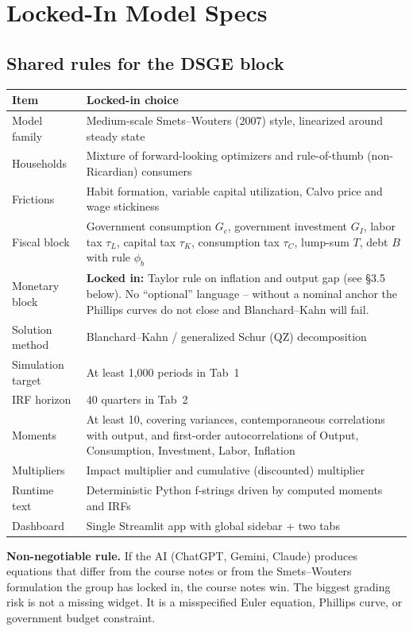 \documentclass[11pt]{article}
\begin{document}
\section{Locked-In Model Specs}

\subsection{Shared rules for the DSGE block}
\begin{tabularx}{\linewidth}{@{}p{3.3cm}X@{}}
\toprule
\textbf{Item} & \textbf{Locked-in choice} \\
\midrule
Model family & Medium-scale Smets--Wouters (2007) style, linearized around steady state \\
Households & Mixture of forward-looking optimizers and rule-of-thumb (non-Ricardian) consumers \\
Frictions & Habit formation, variable capital utilization, Calvo price and wage stickiness \\
Fiscal block & Government consumption $G_c$, government investment $G_I$, labor tax $\tau_L$, capital tax $\tau_K$, consumption tax $\tau_C$, lump-sum $T$, debt $B$ with rule $\phi_b$ \\
Monetary block & \textbf{Locked in:} Taylor rule on inflation and output gap (see \S3.5 below). No ``optional'' language -- without a nominal anchor the Phillips curves do not close and Blanchard--Kahn will fail. \\
Solution method & Blanchard--Kahn / generalized Schur (QZ) decomposition \\
Simulation target & At least 1{,}000 periods in Tab~1 \\
IRF horizon & 40 quarters in Tab~2 \\
Moments & At least 10, covering variances, contemporaneous correlations with output, and first-order autocorrelations of Output, Consumption, Investment, Labor, Inflation \\
Multipliers & Impact multiplier and cumulative (discounted) multiplier \\
Runtime text & Deterministic Python f-strings driven by computed moments and IRFs \\
Dashboard & Single Streamlit app with global sidebar + two tabs \\
\bottomrule
\end{tabularx}

\begin{warningbox}
\textbf{Non-negotiable rule.} If the AI (ChatGPT, Gemini, Claude) produces equations that differ from the course notes or from the Smets--Wouters formulation the group has locked in, the course notes win. The biggest grading risk is not a missing widget. It is a misspecified Euler equation, Phillips curve, or government budget constraint.
\end{warningbox}
\end{document}
